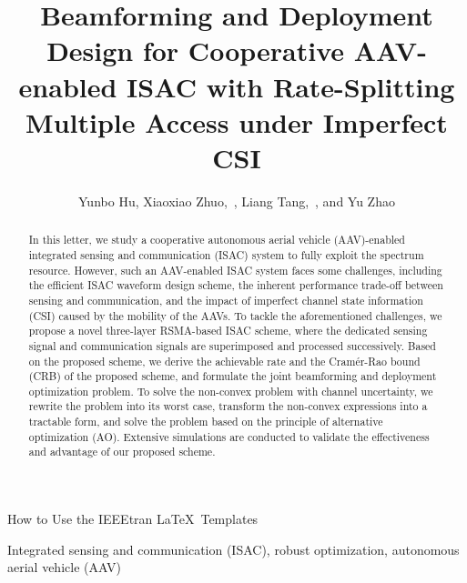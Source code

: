 \documentclass[twocolumn,journal]{IEEEtran}
\begin{document}
\title{Beamforming and Deployment Design for Cooperative AAV-enabled ISAC with Rate-Splitting Multiple Access under Imperfect CSI}
\author{Yunbo Hu, Xiaoxiao Zhuo,~, Liang Tang,~, and Yu Zhao
}

%
{How to Use the IEEEtran \LaTeX \ Templates}

\maketitle

\begin{abstract}
In this letter, we study a cooperative autonomous aerial vehicle (AAV)-enabled integrated sensing and communication (ISAC) system to fully exploit the spectrum resource. However, such an AAV-enabled ISAC system faces some challenges, including the efficient ISAC waveform design scheme, the inherent performance trade-off between sensing and communication, and the impact of imperfect channel state information (CSI) caused by the mobility of the AAVs. To tackle the aforementioned challenges, we propose a novel three-layer RSMA-based ISAC scheme, where the dedicated sensing signal and communication signals are superimposed and processed successively. Based on the proposed scheme, we derive the achievable rate and the Cramér-Rao bound (CRB) of the proposed scheme, and formulate the joint beamforming and deployment optimization problem. To solve the non-convex problem with channel uncertainty, we rewrite the problem into its worst case, transform the non-convex expressions into a tractable form, and solve the problem based on the principle of alternative optimization (AO). Extensive simulations are conducted to validate the effectiveness and advantage of our proposed scheme.
\end{abstract}

\begin{IEEEkeywords}
Integrated sensing and communication (ISAC), robust optimization, autonomous aerial vehicle (AAV)
\end{IEEEkeywords}
\end{document}
